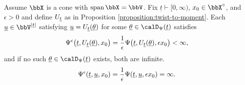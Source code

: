 \begin{proposition}
  \label{proposition:aff-fdd-asymptotics}
  Assume $\stateSpace$ is a cone with $\operatorname{span}\stateSpace = \vecSpace$.
  Fix $\underline t \vdash [0,\infty)$, $\stateVar_0 \in \stateSpace^\circ$, and $\epsilon > 0$ and define $U_{\underline t}$ as in Proposition \ref{proposition:twist-to-moment}.
  Each $\underline\momentVar \in \vecSpace^{|\underline t|}$ satisfying $\underline{u} = U_{\underline t}(\underline{\theta})$ for some $\underline\twistVar \in \momentSpace(\underline t)$ satisfies
  \begin{equation*}
    \Psi^\epsilon\big(\underline t, U_{\underline t}(\underline{\theta}), x_0\big) = \frac1\epsilon \Psi\big(\underline t, U_{\underline t}(\underline{\theta}), \epsilon x_0\big) < \infty,
  \end{equation*}
  and if no such $\underline\twistVar \in \momentSpace(\underline t)$ exists, both are infinite.
  \begin{equation*}
    \Psi^\epsilon(\underline t, \underline{u}, x_0) = \frac1\epsilon \Psi(\underline t, \underline{u}, \epsilon x_0) = \infty.
  \end{equation*}
\end{proposition}
